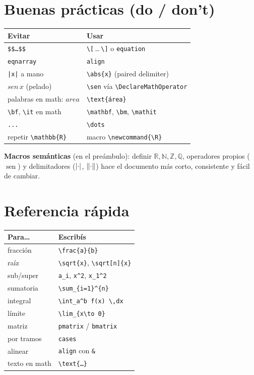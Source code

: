 \documentclass[11pt,a4paper]{article}
\newcommand{\C}[1]{\texttt{\textbackslash #1}}   %
\newcommand{\R}{\mathbb{R}}  \newcommand{\N}{\mathbb{N}}
\newcommand{\Z}{\mathbb{Z}}  \newcommand{\Q}{\mathbb{Q}}  \newcommand{\Cc}{\mathbb{C}}
\DeclareMathOperator{\sen}{sen}
\DeclarePairedDelimiter{\abs}{\lvert}{\rvert}
\DeclarePairedDelimiter{\norm}{\lVert}{\rVert}
\theoremstyle{plain}      %
\theoremstyle{definition} %
\theoremstyle{remark}
\begin{document}
\section{Buenas prácticas (do / don't)}\label{sec:bp}
\begin{center}
\renewcommand{\arraystretch}{1.3}
\begin{tabular}{@{}p{} p{}@{}}
\toprule
\textbf{Evitar} & \textbf{Usar} \\
\midrule
\texttt{\$\$\dots\$\$} & \C{[}\,\dots\,\C{]} o \texttt{equation} \\
\texttt{eqnarray} & \texttt{align} \\
\verb;|x|; a mano & \C{abs\{x\}} (paired delimiter) \\
$sen\,x$ (pelado) & \C{sen} vía \C{DeclareMathOperator} \\
palabras en math: $area$ & \C{text\{área\}} \\
\C{bf}, \C{it} en math & \C{mathbf}, \C{bm}, \C{mathit} \\
\texttt{...} & \C{dots} \\
repetir \C{mathbb\{R\}} & macro \C{newcommand}\texttt{\{\textbackslash R\}} \\
\bottomrule
\end{tabular}
\end{center}

\noindent\textbf{Macros semánticas} (en el preámbulo): definir
$\R,\N,\Z,\Q$, operadores propios ($\sen$) y delimitadores
($\abs{\cdot}$, $\norm{\cdot}$) hace el documento más corto, consistente y
fácil de cambiar.

\section{Referencia rápida}
\begin{center}
\begin{tabular}{@{}ll@{}}
\toprule
\textbf{Para\dots} & \textbf{Escribís} \\
\midrule
fracción & \C{frac\{a\}\{b\}} \\
raíz & \C{sqrt\{x\}}, \C{sqrt[n]\{x\}} \\
sub/super & \verb|a_i|, \verb|x^2|, \verb|x_1^2| \\
sumatoria & \C{sum\_\{i=1\}\^{}\{n\}} \\
integral & \C{int\_a\^{}b f(x)\,}\C{,dx} \\
límite & \C{lim\_\{x}\C{to 0\}} \\
matriz & \texttt{pmatrix} / \texttt{bmatrix} \\
por tramos & \texttt{cases} \\
alinear & \texttt{align} con \verb|&| \\
texto en math & \C{text\{\dots\}} \\
\bottomrule
\end{tabular}
\end{center}
\end{document}
